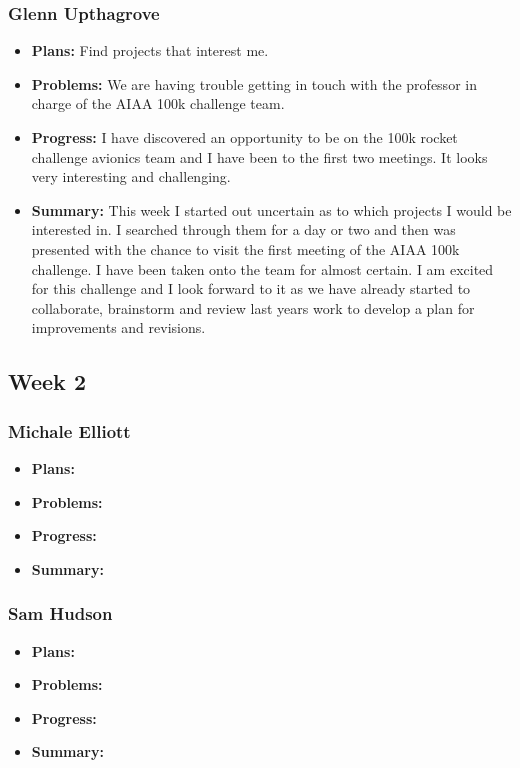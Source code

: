 \documentclass[onecolumn, draftclsnofoot,10pt, compsoc]{IEEEtran}
\begin{document}
\subsubsection{Glenn Upthagrove}
\begin {itemize}
 \item \textbf{Plans: }Find projects that interest me. 
 \item \textbf{Problems: }We are having trouble getting in touch with the professor in charge of the AIAA 100k challenge team. 
 \item \textbf{Progress: }I have discovered an opportunity to be on the 100k rocket challenge avionics team and I have been to the first two meetings. It looks very interesting and challenging.  
 \item \textbf{Summary: }This week I started out uncertain as to which projects I would be interested in. I searched through them for a day or two and then was presented with the chance to visit the first meeting of the AIAA 100k challenge. I have been taken onto the team for almost certain. I am excited for this challenge and I look forward to it as we have already started to collaborate, brainstorm and review last years work to develop a plan for improvements and revisions.  
\end {itemize}
\subsection {Week 2}
\subsubsection{Michale Elliott}
\begin {itemize}
 \item \textbf{Plans: }
 \item \textbf{Problems: }
 \item \textbf{Progress: }
 \item \textbf{Summary: }
\end {itemize}
\subsubsection{Sam Hudson}
\begin {itemize}
 \item \textbf{Plans: }
 \item \textbf{Problems: }
 \item \textbf{Progress: }
 \item \textbf{Summary: }
\end {itemize}
\end{document}
